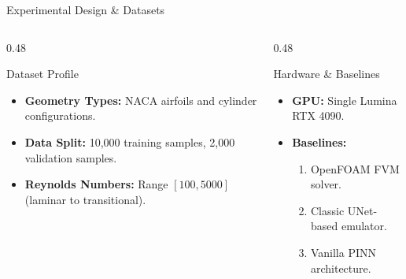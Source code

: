 \documentclass[aspectratio=169,10pt]{beamer}
\begin{document}
\begin{frame}{Experimental Design \& Datasets}
  \begin{columns}[T]
    \begin{column}{0.48\textwidth}
      \begin{defenseblock}{Dataset Profile}
        \begin{itemize}
          \item \textbf{Geometry Types:} NACA airfoils and cylinder configurations.
          \item \textbf{Data Split:} 10,000 training samples, 2,000 validation samples.
          \item \textbf{Reynolds Numbers:} Range $[100, 5000]$ (laminar to transitional).
        \end{itemize}
      \end{defenseblock}
    \end{column}
    \begin{column}{0.48\textwidth}
      \begin{defenseblock}{Hardware \& Baselines}
        \begin{itemize}
          \item \textbf{GPU:} Single Lumina RTX 4090.
          \item \textbf{Baselines:} 
            \begin{enumerate}
              \item OpenFOAM FVM solver.
              \item Classic UNet-based emulator.
              \item Vanilla PINN architecture.
            \end{enumerate}
        \end{itemize}
      \end{defenseblock}
    \end{column}
  \end{columns}
\end{frame}
\end{document}
